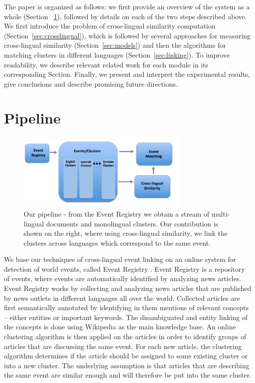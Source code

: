 \documentclass[twoside,11pt]{article}
\begin{document}
The paper is organized as follows: we first provide an overview of the system as a whole (Section ~\ref{sec:pipeline}), followed by details on each of the two steps described above. We first introduce the problem of cross-lingual similarity computation (Section~\ref{sec:crosslingual}), which is followed by several approaches for measuring cross-lingual similarity (Section~\ref{sec:models}) and then the algorithms for matching clusters in different languages (Section~\ref{sec:linking}).  To improve readability, we describe relevant related work for each module in its corresponding Section. Finally, we present and interpret the experimental results, give conclusions and describe promising future directions.


\section{Pipeline}\label{sec:pipeline}

\begin{figure}[tb]
\centering
\includegraphics[width=0.75\textwidth]{pipeline1}
\caption{\label{fig:pipeline} Our pipeline - from the Event Registry we obtain a stream of multi-lingual documents and monolingual clusters. Our contribution is shown on the right, where using cross-lingual similarity, we link the clusters across languages which correspond to the same event.}
\end{figure}

We base our techniques of cross-lingual event linking on an online system for detection of world events, called Event Registry . Event Registry is a repository of events, where events are automatically identified by analyzing news articles.  Event Registry works by collecting and analyzing news articles that are published by news outlets in different languages all over the world. Collected articles are first semantically annotated by identifying in them mentions of relevant concepts -- either entities or important keywords. The disambiguated and entity linking of the concepts is done using Wikipedia as the main knowledge base. An online clustering algorithm is then applied on the articles in order to identify groups of articles that are discussing the same event. For each new article, the clustering algorithm determines if the article should be assigned to some existing cluster or into a new cluster. The underlying assumption is that articles that are describing the same event are similar enough and will therefore be put into the same cluster.
\end{document}
